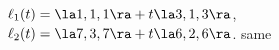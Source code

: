 {$\ell_1(t) = \la 1,1,1\ra + t\la 3,1,3\ra$,\\
$\ell_2(t) = \la 7,3,7\ra + t\la 6,2,6\ra$.
}
{same
}

